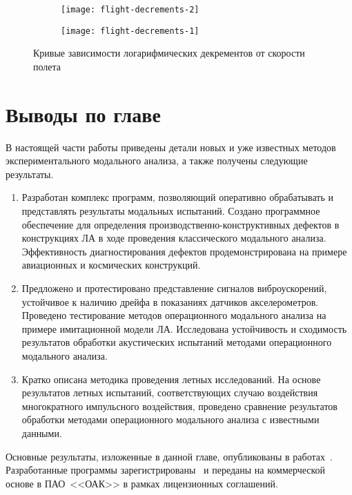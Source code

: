 \def\sfFlight{0.48\textwidth}

\begin{figure}[!htb]
	\begin{subfigure}[b]{\sfFlight}
		\centering
     	\texttt{[image: flight-decrements-2]} 
    \end{subfigure}
    \hfill
    \begin{subfigure}[b]{\sfFlight}
		\centering
		\texttt{[image: flight-decrements-1]}
    \end{subfigure}
    \caption{Кривые зависимости логарифмических декрементов от скорости полета} \label{fig:flight-decrements}
\end{figure}

\section{Выводы по главе \thechapter}

В настоящей части работы приведены детали новых и уже известных методов экспериментального модального анализа, а также получены следующие результаты.
\begin{enumerate}
	\item Разработан комплекс программ, позволяющий оперативно обрабатывать и представлять результаты модальных испытаний. Создано программное обеспечение для определения производственно-конструктивных дефектов в конструкциях ЛА в ходе проведения классического модального анализа. Эффективность диагностирования дефектов продемонстрирована на примере авиационных и космических конструкций.
	\item Предложено и протестировано представление сигналов виброускорений, устойчивое к наличию дрейфа в показаниях датчиков акселерометров. Проведено тестирование методов операционного модального анализа на примере имитационной модели ЛА. Исследована устойчивость и сходимость результатов обработки акустических испытаний методами операционного модального анализа. 
	\item Кратко описана методика проведения летных исследований. На основе результатов летных испытаний, соответствующих случаю воздействия многократного импульсного воздействия, проведено сравнение результатов обработки методами операционного модального анализа с известными данными.
\end{enumerate}

Основные результаты, изложенные в данной главе, опубликованы в работах~\cite{lib:author:iss2017:crackIdentification, lib:author:gorshkov:crackIdentification, lib:author:iss2018:crackIdentification, lib:author:metal:crackIdentification, lib:author:nti2019:gvt, lib:author:metal:gapsIdentification, lib:author:certificate:GenCalc, lib:author:certificate:ResponseAnalyzer, lib:author:certificate:DistortionFinder, lib:author:sibnia2021:ModalData, lib:author:sibnia2021:defects, lib:author:chinese:defects, lib:author:iss2021:defects, lib:author:flight:modalData, lib:author:flight:defects, lib:author:iss2022:oma, lib:author:tsagi:defects, lib:author:certificate:FlightLab}. Разработанные программы зарегистрированы~ и переданы на коммерческой основе в ПАО~<<ОАК>> в рамках лицензионных соглашений. 